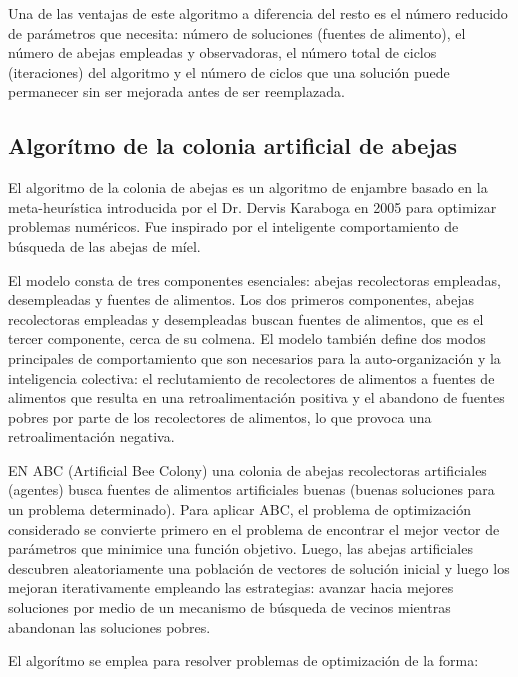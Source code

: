 \documentclass{article}
\begin{document}
Una de las ventajas de este algoritmo a diferencia del resto es el número reducido de parámetros que necesita: número de soluciones (fuentes de alimento), el número de abejas empleadas y observadoras, el número total de ciclos (iteraciones) del algoritmo y el número de ciclos que una
solución puede permanecer sin ser mejorada antes de ser reemplazada.



\subsection{Algor\'itmo de la colonia artificial de abejas}
El algoritmo de la colonia de abejas es un algoritmo de enjambre basado en la meta-heurística introducida por el Dr. Dervis Karaboga en 2005 para optimizar problemas numéricos. Fue inspirado por el inteligente comportamiento de búsqueda de las abejas de m\'iel. 

\medskip

El modelo consta de tres componentes esenciales: abejas recolectoras empleadas, desempleadas y fuentes de alimentos. Los dos primeros componentes, abejas recolectoras empleadas y desempleadas buscan fuentes de alimentos, que es el tercer componente, cerca de su colmena. El modelo también define dos modos principales de comportamiento que son necesarios para la auto-organización y la inteligencia colectiva: el reclutamiento de recolectores de alimentos a fuentes de alimentos que resulta en una retroalimentación positiva y el abandono de fuentes pobres por parte de los recolectores de alimentos, lo que provoca una retroalimentación negativa.

\medskip

EN ABC (Artificial Bee Colony) una colonia de abejas recolectoras artificiales (agentes) busca fuentes de alimentos artificiales buenas (buenas soluciones para un problema determinado). Para aplicar ABC, el problema de optimización considerado se convierte primero en el problema de encontrar el mejor vector de parámetros que minimice una función objetivo. Luego, las abejas artificiales descubren aleatoriamente una población de vectores de solución inicial y luego los mejoran iterativamente empleando las estrategias: avanzar hacia mejores soluciones por medio de un mecanismo de búsqueda de vecinos mientras abandonan las soluciones pobres.

\medskip

El algor\'itmo se emplea para resolver problemas de optimizaci\'on de la forma:
\end{document}
